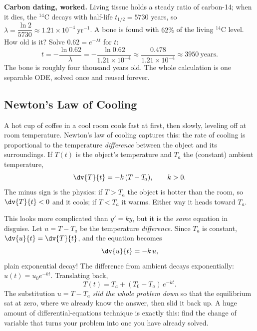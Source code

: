 \begin{applicationbox}
\textbf{Carbon dating, worked.} Living tissue holds a steady ratio of carbon-14;
when it dies, the $^{14}$C decays with half-life $t_{1/2}=5730$ years, so
$\lambda = \dfrac{\ln 2}{5730}\approx 1.21\times 10^{-4}\ \text{yr}^{-1}$. A bone is
found with $62\%$ of the living $^{14}$C level. How old is it? Solve
$0.62 = e^{-\lambda t}$ for $t$:
\[
  t = -\frac{\ln 0.62}{\lambda}
    = -\frac{\ln 0.62}{1.21\times 10^{-4}}
    \approx \frac{0.478}{1.21\times 10^{-4}}
    \approx 3950\ \text{years}.
\]
The bone is roughly four thousand years old. The whole calculation is one
separable ODE, solved once and reused forever.
\end{applicationbox}

\subsection{Newton's Law of Cooling}

A hot cup of coffee in a cool room cools fast at first, then slowly, leveling off at
room temperature. Newton's law of cooling captures this: the rate of cooling is
proportional to the temperature \emph{difference} between the object and its
surroundings. If $T(t)$ is the object's temperature and $T_{\!a}$ the (constant)
ambient temperature,
\[
  \dv{T}{t} = -k\,(T - T_{\!a}), \qquad k>0.
\]
The minus sign is the physics: if $T>T_{\!a}$ the object is hotter than the room, so
$\dv{T}{t}<0$ and it cools; if $T<T_{\!a}$ it warms. Either way it heads toward
$T_{\!a}$.

\begin{whybox}
This looks more complicated than $y'=ky$, but it is the \emph{same} equation in
disguise. Let $u = T - T_{\!a}$ be the temperature \emph{difference}. Since $T_{\!a}$
is constant, $\dv{u}{t} = \dv{T}{t}$, and the equation becomes
\[
  \dv{u}{t} = -k\,u,
\]
plain exponential decay! The difference from ambient decays exponentially:
$u(t)=u_0 e^{-kt}$. Translating back,
\[
  T(t) = T_{\!a} + (T_0 - T_{\!a})\,e^{-kt}.
\]
The substitution $u=T-T_{\!a}$ \emph{slid the whole problem down} so that the
equilibrium sat at zero, where we already know the answer, then slid it back up. A
huge amount of differential-equations technique is exactly this: find the change of
variable that turns your problem into one you have already solved.
\end{whybox}

